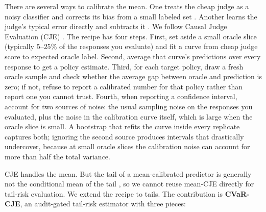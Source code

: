 There are several ways to calibrate the mean. One treats the cheap judge as
a noisy classifier and corrects its bias from a small labeled set
\citep{Lee2025LLMJudgeReporting}. Another learns the judge's typical
error directly and subtracts it \citep{Chen2026EfficientLLMJudge}. We
follow Causal Judge Evaluation (CJE) \citep{LandesbergNarayan2026CJE}.
The recipe has four steps. First,
set aside a small oracle slice (typically $5$--$25\%$ of the responses
you evaluate) and fit a curve from cheap judge score to expected
oracle label. Second, average that curve's predictions over every
response to get a policy estimate. Third, for each target policy,
draw a fresh oracle sample and check whether the average gap between
oracle and prediction is zero; if not, refuse to report a calibrated
number for that policy rather than report one you cannot trust.
Fourth, when reporting a confidence interval, account for two sources
of noise: the usual sampling noise on the responses you evaluated,
plus the noise in the calibration curve itself, which is large when
the oracle slice is small. A bootstrap that refits the curve inside
every replicate captures both; ignoring the second source produces
intervals that drastically undercover, because at small oracle slices
the calibration noise can account for more than half the total
variance.

CJE handles the mean. But the tail of a mean-calibrated predictor is
generally not the conditional mean of the tail
\citep{Allen2024TailCalibration}, so we cannot reuse mean-CJE directly
for tail-risk evaluation. We extend the recipe to tails. The
contribution is \textbf{CVaR-CJE}, an audit-gated tail-risk estimator
with three pieces:

